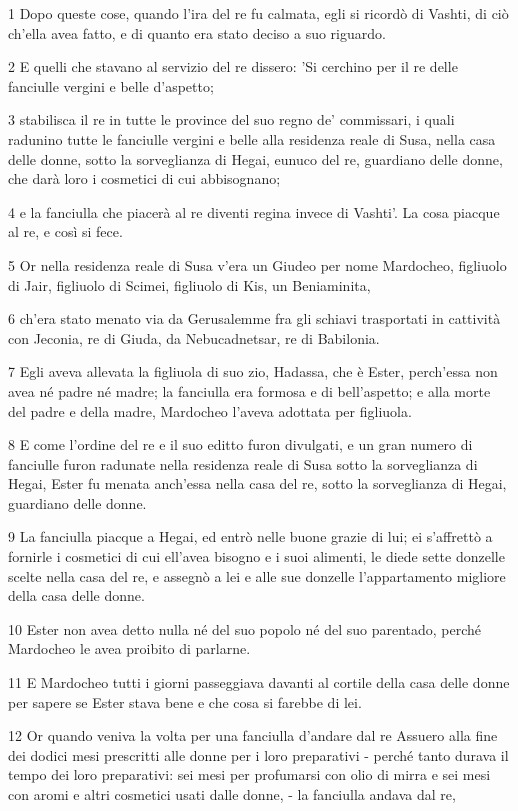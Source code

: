 \par 1 Dopo queste cose, quando l'ira del re fu calmata, egli si ricordò di Vashti, di ciò ch'ella avea fatto, e di quanto era stato deciso a suo riguardo.
\par 2 E quelli che stavano al servizio del re dissero: 'Si cerchino per il re delle fanciulle vergini e belle d'aspetto;
\par 3 stabilisca il re in tutte le province del suo regno de' commissari, i quali radunino tutte le fanciulle vergini e belle alla residenza reale di Susa, nella casa delle donne, sotto la sorveglianza di Hegai, eunuco del re, guardiano delle donne, che darà loro i cosmetici di cui abbisognano;
\par 4 e la fanciulla che piacerà al re diventi regina invece di Vashti'. La cosa piacque al re, e così si fece.
\par 5 Or nella residenza reale di Susa v'era un Giudeo per nome Mardocheo, figliuolo di Jair, figliuolo di Scimei, figliuolo di Kis, un Beniaminita,
\par 6 ch'era stato menato via da Gerusalemme fra gli schiavi trasportati in cattività con Jeconia, re di Giuda, da Nebucadnetsar, re di Babilonia.
\par 7 Egli aveva allevata la figliuola di suo zio, Hadassa, che è Ester, perch'essa non avea né padre né madre; la fanciulla era formosa e di bell'aspetto; e alla morte del padre e della madre, Mardocheo l'aveva adottata per figliuola.
\par 8 E come l'ordine del re e il suo editto furon divulgati, e un gran numero di fanciulle furon radunate nella residenza reale di Susa sotto la sorveglianza di Hegai, Ester fu menata anch'essa nella casa del re, sotto la sorveglianza di Hegai, guardiano delle donne.
\par 9 La fanciulla piacque a Hegai, ed entrò nelle buone grazie di lui; ei s'affrettò a fornirle i cosmetici di cui ell'avea bisogno e i suoi alimenti, le diede sette donzelle scelte nella casa del re, e assegnò a lei e alle sue donzelle l'appartamento migliore della casa delle donne.
\par 10 Ester non avea detto nulla né del suo popolo né del suo parentado, perché Mardocheo le avea proibito di parlarne.
\par 11 E Mardocheo tutti i giorni passeggiava davanti al cortile della casa delle donne per sapere se Ester stava bene e che cosa si farebbe di lei.
\par 12 Or quando veniva la volta per una fanciulla d'andare dal re Assuero alla fine dei dodici mesi prescritti alle donne per i loro preparativi - perché tanto durava il tempo dei loro preparativi: sei mesi per profumarsi con olio di mirra e sei mesi con aromi e altri cosmetici usati dalle donne, - la fanciulla andava dal re,
